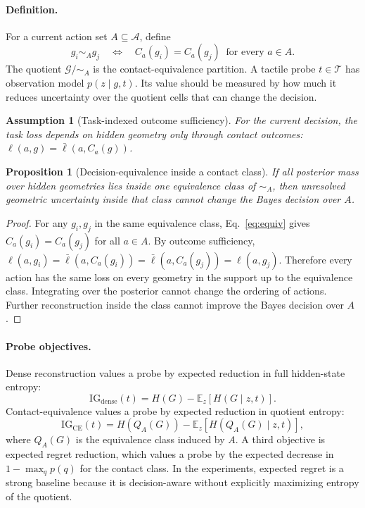 \documentclass{article}
\newtheorem{proposition}{Proposition}
\newtheorem{assumption}{Assumption}
\newcommand{\Geom}{\mathcal{G}}
\newcommand{\Act}{\mathcal{A}}
\newcommand{\Touch}{\mathcal{T}}
\newcommand{\loss}{\ell}
\newcommand{\IG}{\mathrm{IG}}
\newcommand{\EE}{\mathbb{E}}
\begin{document}
\paragraph{Definition.}
For a current action set $A\subseteq\Act$, define
\begin{equation}
    g_i\sim_A g_j
    \quad\Longleftrightarrow\quad
    C_a(g_i)=C_a(g_j)\;\; \text{for every } a\in A.
    \label{eq:equiv}
\end{equation}
The quotient $\Geom/{\sim_A}$ is the contact-equivalence partition. A tactile probe $t\in\Touch$ has observation model $p(z\mid g,t)$. Its value should be measured by how much it reduces uncertainty over the quotient cells that can change the decision.

\begin{assumption}[Task-indexed outcome sufficiency]
For the current decision, the task loss depends on hidden geometry only through contact outcomes: $\loss(a,g)=\bar{\loss}(a,C_a(g))$.
\end{assumption}

\begin{proposition}[Decision-equivalence inside a contact class]
If all posterior mass over hidden geometries lies inside one equivalence class of $\sim_A$, then unresolved geometric uncertainty inside that class cannot change the Bayes decision over $A$.
\end{proposition}

\begin{proof}
For any $g_i,g_j$ in the same equivalence class, Eq.~\ref{eq:equiv} gives $C_a(g_i)=C_a(g_j)$ for all $a\in A$. By outcome sufficiency, $\loss(a,g_i)=\bar{\loss}(a,C_a(g_i))=\bar{\loss}(a,C_a(g_j))=\loss(a,g_j)$. Therefore every action has the same loss on every geometry in the support up to the equivalence class. Integrating over the posterior cannot change the ordering of actions. Further reconstruction inside the class cannot improve the Bayes decision over $A$.
\end{proof}

\paragraph{Probe objectives.}
Dense reconstruction values a probe by expected reduction in full hidden-state entropy:
\begin{equation}
    \IG_{\mathrm{dense}}(t)
    =
    H(G)-\EE_z[H(G\mid z,t)].
\end{equation}
Contact-equivalence values a probe by expected reduction in quotient entropy:
\begin{equation}
    \IG_{\mathrm{CE}}(t)
    =
    H(Q_A(G))-\EE_z[H(Q_A(G)\mid z,t)],
\end{equation}
where $Q_A(G)$ is the equivalence class induced by $A$. A third objective is expected regret reduction, which values a probe by the expected decrease in $1-\max_q p(q)$ for the contact class. In the experiments, expected regret is a strong baseline because it is decision-aware without explicitly maximizing entropy of the quotient.
\end{document}
